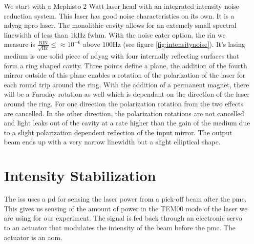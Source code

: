 We start with a Mephisto 2 Watt laser head with an integrated intensity
noise reduction system.
This laser has good noise characteristics on its own.
It is a \ac{ndyag} \ac{npro} laser. The monolithic cavity allows for an
extemely small spectral linewidth of less than 1kHz \ac{fwhm}.
With the noise eater option, the \ac{rin} we measure is
$\frac{\mathrm{RIN}}{\sqrt{\mathrm{Hz}}}\leq \approx 10^{-6}$
above $100\mathrm{Hz}$ (see figure \ref{fig:intensitynoise}).
It's lasing medium is one solid piece of \ac{ndyag} with four internally
reflecting surfaces that form a ring shaped cavity.
Three points define a plane, the addition of the fourth mirror outside of this
plane enables a rotation of the polarization of the laser for each round trip
around the ring.
With the addition of a permanent magnet, there will be a Faraday rotation as
well which is dependant on the direction of the laser around the ring.
For one direction the polarization rotation from the two effects are cancelled.
In the other direction, the polarization rotations are not cancelled and light
leaks out of the cavity at a rate higher than the gain of the medium due to a
slight polarization dependent reflection of the input mirror.
The output beam ends up with a very narrow linewidth but a slight elliptical
shape.


\section{Intensity Stabilization}


The \ac{iss} uses a \ac{pd} for sensing the laser power from a pick-off
beam after the \ac{pmc}. This gives us sensing of the amount of power in
the TEM00 mode of the laser we are using for our experiment. The signal is
fed back through an electronic servo to an actuator that modulates the
intensity of the beam before the \ac{pmc}. The actuator is an \ac{aom}.

